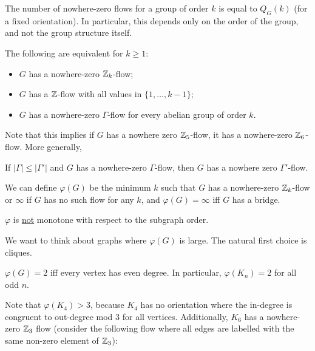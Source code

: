 \documentclass[main.tex]{subfiles}
\begin{document}
The number of nowhere-zero flows for a group of order $k$ is equal to
$Q_G(k)$ (for a fixed orientation).
In particular, this depends only on the order of the group, and not the group
structure itself.
\begin{corollary}[Tutte]
  The following are equivalent for $k\geq 1$:
  \begin{itemize}
    \item $G$ has a nowhere-zero $\mathbb Z_k$-flow;
    \item $G$ has a $\mathbb Z$-flow with all values in $\{1,\ldots,k-1\}$;
    \item $G$ has a nowhere-zero $\Gamma$-flow for every abelian group of order $k$.
  \end{itemize}
\end{corollary}
Note that this implies if $G$ has a nowhere zero $\mathbb Z_5$-flow, it has a
nowhere-zero $\mathbb Z_6$-flow.
More generally,
\begin{corollary}
  If $|\Gamma|\leq|\Gamma'|$ and $G$ has a nowhere-zero $\Gamma$-flow,
  then $G$ has a nowhere zero $\Gamma'$-flow.
\end{corollary}
We can define $\varphi(G)$ be the minimum $k$ such that $G$ has a nowhere-zero
$\mathbb Z_k$-flow or $\infty$ if $G$ has no such flow for any $k$,
and $\varphi(G) = \infty$ iff $G$ has a bridge.
\begin{note*}%
  $\varphi$ is \underline{not} monotone with respect to the subgraph order.
\end{note*}
We want to think about graphs where $\varphi(G)$ is large.
The natural first choice is cliques.
\begin{proposition}
  $\varphi(G) = 2$ iff every vertex has even degree.
  In particular, $\varphi(K_n) = 2$ for all odd $n$.
\end{proposition}
Note that $\varphi(K_4) > 3$, because $K_4$ has no orientation where the
in-degree is congruent to out-degree mod 3 for all vertices.
Additionally, $K_6$ has a nowhere-zero $\mathbb Z_3$ flow (consider the following
flow where all edges are labelled with the same non-zero element of $\mathbb Z_3$):
\end{document}

